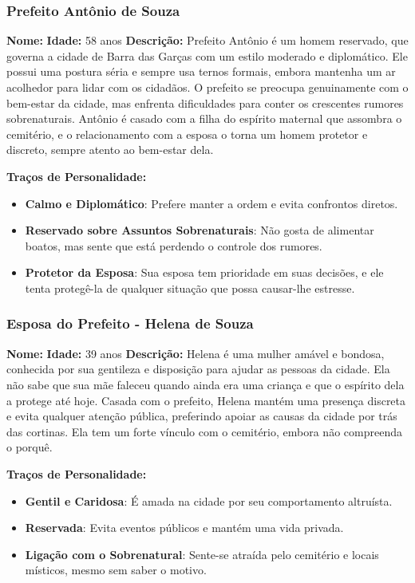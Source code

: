 \begin{personagem}
\subsubsection{Prefeito Antônio de Souza}
\textbf{Nome:} 
\textbf{Idade:} 58 anos  
\textbf{Descrição:}  
Prefeito Antônio é um homem reservado, que governa a cidade de Barra das Garças com um estilo moderado e diplomático. Ele possui uma postura séria e sempre usa ternos formais, embora mantenha um ar acolhedor para lidar com os cidadãos. O prefeito se preocupa genuinamente com o bem-estar da cidade, mas enfrenta dificuldades para conter os crescentes rumores sobrenaturais. Antônio é casado com a filha do espírito maternal que assombra o cemitério, e o relacionamento com a esposa o torna um homem protetor e discreto, sempre atento ao bem-estar dela.

\textbf{Traços de Personalidade:}
\begin{itemize}
    \item \textbf{Calmo e Diplomático}: Prefere manter a ordem e evita confrontos diretos.
    \item \textbf{Reservado sobre Assuntos Sobrenaturais}: Não gosta de alimentar boatos, mas sente que está perdendo o controle dos rumores.
    \item \textbf{Protetor da Esposa}: Sua esposa tem prioridade em suas decisões, e ele tenta protegê-la de qualquer situação que possa causar-lhe estresse.
\end{itemize}
\end{personagem}
\begin{personagem}  
\subsubsection{Esposa do Prefeito - Helena de Souza}

\textbf{Nome:} 
\textbf{Idade:} 39 anos  
\textbf{Descrição:}  
Helena é uma mulher amável e bondosa, conhecida por sua gentileza e disposição para ajudar as pessoas da cidade. Ela não sabe que sua mãe faleceu quando ainda era uma criança e que o espírito dela a protege até hoje. Casada com o prefeito, Helena mantém uma presença discreta e evita qualquer atenção pública, preferindo apoiar as causas da cidade por trás das cortinas. Ela tem um forte vínculo com o cemitério, embora não compreenda o porquê.

\textbf{Traços de Personalidade:}
\begin{itemize}
    \item \textbf{Gentil e Caridosa}: É amada na cidade por seu comportamento altruísta.
    \item \textbf{Reservada}: Evita eventos públicos e mantém uma vida privada.
    \item \textbf{Ligação com o Sobrenatural}: Sente-se atraída pelo cemitério e locais místicos, mesmo sem saber o motivo.
\end{itemize}
\end{personagem}
